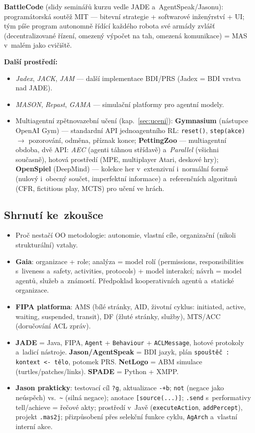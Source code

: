 \documentclass[11pt,a4paper]{article}
\theoremstyle{definition}
\begin{document}
\textbf{BattleCode} (slidy seminářů kurzu vedle JADE a~AgentSpeak/Jasonu): programátorská
soutěž MIT --- bitevní strategie + softwarové inženýrství + UI; tým píše program autonomně
řídící každého robota své armády zvlášť (decentralizované řízení, omezený výpočet na tah,
omezená komunikace) = MAS v~malém jako cvičiště.

\textbf{Další prostředí:}
\begin{itemize}
\item \emph{Jadex}, \emph{JACK}, \emph{JAM} --- další implementace BDI/PRS (Jadex = BDI
  vrstva nad JADE).
\item \emph{MASON}, \emph{Repast}, \emph{GAMA} --- simulační platformy pro agentní modely.
\item Multiagentní zpětnovazební učení (kap.~\ref{sec:uceni}):
  \textbf{Gymnasium} (nástupce OpenAI Gym) --- standardní API jednoagentního RL:
  \texttt{reset()}, \texttt{step(akce)} $\to$ pozorování, odměna, příznak konce;
  \textbf{PettingZoo} --- multiagentní obdoba, dvě API: \emph{AEC} (agenti táhnou střídavě)
  a~\emph{Parallel} (všichni současně), hotová prostředí (MPE, multiplayer Atari, deskové
  hry);
  \textbf{OpenSpiel} (DeepMind) --- kolekce her v~extenzivní i~normální formě (nulový
  i~obecný součet, imperfektní informace) a~referenčních algoritmů (CFR, fictitious play,
  MCTS) pro učení ve hrách.
\end{itemize}

\subsection{Shrnutí ke~zkoušce}

\begin{itemize}
\item Proč nestačí OO metodologie: autonomie, vlastní cíle, organizační (nikoli strukturální)
  vztahy.
\item \textbf{Gaia}: organizace + role; analýza = model rolí (permissions, responsibilities
  s~liveness a~safety, activities, protocols) + model interakcí; návrh = model agentů,
  služeb a~známostí. Předpoklad kooperativních agentů a~statické organizace.
\item \textbf{FIPA platforma}: AMS (bílé stránky, AID, životní cyklus: initiated, active,
  waiting, suspended, transit), DF (žluté stránky, služby), MTS/ACC (doručování ACL zpráv).
\item \textbf{JADE} = Java, FIPA, \texttt{Agent} + \texttt{Behaviour} + \texttt{ACLMessage},
  hotové protokoly a~ladicí nástroje. \textbf{Jason/AgentSpeak} = BDI jazyk,
  plán \texttt{spouštěč : kontext <- tělo}, potomek PRS. \textbf{NetLogo} = ABM simulace
  (turtles/patches/links). \textbf{SPADE} = Python + XMPP.
\item \textbf{Jason prakticky}: testovací cíl \texttt{?g}, aktualizace \texttt{-+b};
  \texttt{not} (negace jako neúspěch) vs.\ \texttt{\textasciitilde} (silná negace); anotace
  \texttt{[source(...)]}; \texttt{.send} s~performativy tell/achieve = řečové akty; prostředí
  v~Javě (\texttt{executeAction}, \texttt{addPercept}), projekt \texttt{.mas2j}; přizpůsobení
  přes selekční funkce cyklu, \texttt{AgArch} a~vlastní interní akce.
\end{itemize}
\end{document}
